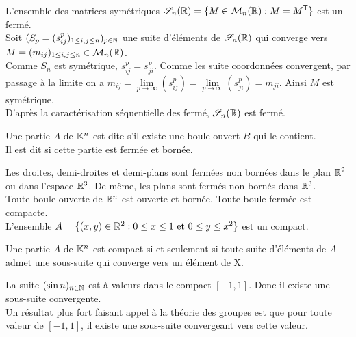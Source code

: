 \documentclass{book}
\begin{document}
\begin{Exemple}
L'ensemble des matrices symétriques $\mathscr{S}_n(\mathbb{R})=\{M\in\mathcal{M}_{n}(\mathbb{R}):M=M^{\mathsf {T}}\}$ est un fermé.\\
Soit $(S_p=(s^p_{i j})_{1\leq i,j\leq n} )_{p\in\mathbb{N}}$ une suite d'éléments de $\mathscr{S}_n(\mathbb{R})$ qui converge vers $M=(m_{ij})_{1\leq i,j\leq n}\in \mathcal{M}_{n}(\mathbb{R})$.\\
Comme $S_n$ est symétrique, $s^p_{i j}=s^p_{j i}$. Comme les suite coordonnées convergent, par passage à la limite on a $m_{ij}=\lim\limits_{p\to\infty}(s^p_{i j})=\lim\limits_{p\to\infty}(s^p_{j i})=m_{ji}$. Ainsi $M$ est symétrique.\\ 
D'après la caractérisation séquentielle des fermé, $\mathscr{S}_n(\mathbb{R})$ est fermé.
\end{Exemple}
\begin{Definition}
Une partie $A$ de $\mathbb{K}^n$ est dite  s'il existe une boule ouvert $B$ qui le contient.\\
Il est dit  si cette partie est fermée et bornée. 
\end{Definition}
\begin{Exemple}
Les droites, demi-droites et demi-plans sont fermées non bornées dans le plan $\mathbb{R}^2$ ou dans l'espace $\mathbb{R}^3$. De même, les plans sont fermés non bornés dans $\mathbb{R}^3$.\\
Toute boule ouverte de $\mathbb{R}^n$ est ouverte et bornée. Toute boule fermée est compacte.\\
L'ensemble $A=\{(x,y)\in\mathbb{R}^2: 0\leq x \leq 1\text{ et }0\leq y\leq x^2\}$ est un compact.\\

\end{Exemple}
\begin{Theoreme}
Une partie $A$ de $\mathbb{K}^n$ est compact  si et seulement si toute suite d'éléments de $A$ admet une sous-suite qui converge vers un élément de X.
\end{Theoreme}
\begin{Exemple}
La suite $(\sin n)_{n\in\mathbb{N}}$ est à valeurs dans le compact $[-1,1]$. Donc il existe une sous-suite convergente.\\
Un résultat plus fort faisant appel à la théorie des groupes est que pour toute valeur de $[-1,1]$, il existe une sous-suite convergeant vers cette valeur.   
\end{Exemple}
\end{document}
